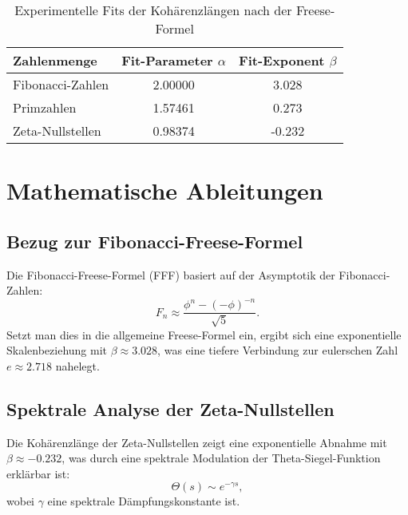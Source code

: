 \documentclass[a4paper,12pt]{article}
\begin{document}
\begin{table}[h]
    \centering
    \renewcommand{\arraystretch}{1.2}
    \begin{tabular}{l c c}
        \toprule
        \textbf{Zahlenmenge} & \textbf{Fit-Parameter $\alpha$} & \textbf{Fit-Exponent $\beta$} \\
        \midrule
        Fibonacci-Zahlen     & 2.00000  & 3.028 \\
        Primzahlen          & 1.57461  & 0.273 \\
        Zeta-Nullstellen    & 0.98374  & -0.232 \\
        \bottomrule
    \end{tabular}
    \caption{Experimentelle Fits der Kohärenzlängen nach der Freese-Formel}
    \label{tab:fits}
\end{table}

\section{Mathematische Ableitungen}
\subsection{Bezug zur Fibonacci-Freese-Formel}
Die Fibonacci-Freese-Formel (FFF) basiert auf der Asymptotik der Fibonacci-Zahlen:
\begin{equation}
    F_n \approx \frac{\phi^n - (-\phi)^{-n}}{\sqrt{5}}.
\end{equation}
Setzt man dies in die allgemeine Freese-Formel ein, ergibt sich eine exponentielle Skalenbeziehung mit $\beta \approx 3.028$, was eine tiefere Verbindung zur eulerschen Zahl $e \approx 2.718$ nahelegt.

\subsection{Spektrale Analyse der Zeta-Nullstellen}
Die Kohärenzlänge der Zeta-Nullstellen zeigt eine exponentielle Abnahme mit $\beta \approx -0.232$, was durch eine spektrale Modulation der Theta-Siegel-Funktion erklärbar ist:
\begin{equation}
    \Theta(s) \sim e^{-\gamma s},
\end{equation}
wobei $\gamma$ eine spektrale Dämpfungskonstante ist.
\end{document}
